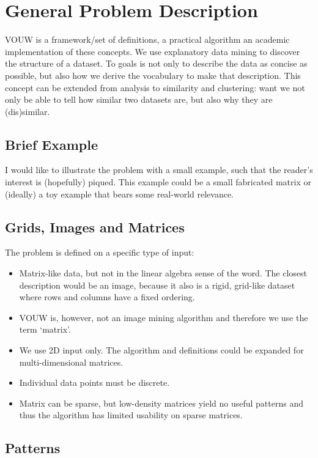 \documentclass[a4paper,notoc,oneside]{tufte-book}
\begin{document}
\section{General Problem Description}

VOUW is a framework/set of definitions, a practical algorithm an academic implementation of these concepts. We use explanatory data mining to discover the structure of a dataset. To goals is not only to describe the data as concise as possible, but also how we derive the vocabulary to make that description. This concept can be extended from analysis to similarity and clustering: want we not only be able to tell how similar two datasets are, but also why they are (dis)similar. 

\subsection{Brief Example}

I would like to illustrate the problem with a small example, such that the reader's interest is (hopefully) piqued. This example could be a small fabricated matrix or (ideally) a toy example that bears some real-world relevance.

\subsection{Grids, Images and Matrices}

The problem is defined on a specific type of input:
\begin{itemize}
\item Matrix-like data, but not in the linear algebra sense of the word. The closest description would be an image, because it also is a rigid, grid-like dataset where rows and columns have a fixed ordering.
\item VOUW is, however, not an image mining algorithm and therefore we use the term `matrix'.
\item We use 2D input only. The algorithm and definitions could be expanded for multi-dimensional matrices. 
\item Individual data points must be discrete.
\item Matrix can be sparse, but low-density matrices yield no useful patterns and thus the algorithm has limited usability on sparse matrices.
\end{itemize}

\subsection{Patterns}
\end{document}
